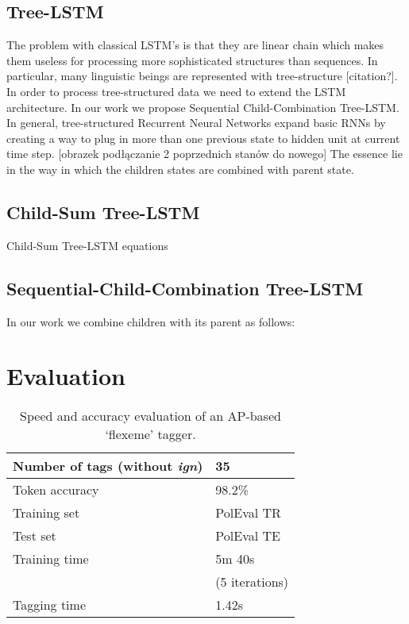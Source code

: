 \documentclass[10pt, a4paper]{article}
\begin{document}
\subsection{Tree-LSTM}
	The problem with classical LSTM's is that they are linear chain which makes them useless for processing more sophisticated structures than sequences. In particular, many linguistic beings are represented with tree-structure [citation?].
	In order to process tree-structured data we need to extend the LSTM architecture. In our work we propose Sequential Child-Combination Tree-LSTM.
	In general, tree-structured Recurrent Neural Networks expand basic RNNs by creating a way to plug in more than one previous state to hidden unit at current time step.
	[obrazek podłączanie 2 poprzednich stanów do nowego]
	The essence lie in the way in which the children states are combined with parent state.

\subsection{Child-Sum Tree-LSTM}
        Child-Sum Tree-LSTM equations
	
\subsection{Sequential-Child-Combination Tree-LSTM}
	In our work we combine children with its parent as follows:
	
\section{Evaluation} 

\begin{table}[h]
 \begin{center}
\begin{tabular}{|l|l|}

      \hline
      Number of tags (without \textit{ign}) & 35\\
      \hline
      Token accuracy & 98.2\%\\
      \hline
      Training set & PolEval TR\\
      \hline
      Test set & PolEval TE\\
           \hline
      Training time & 5m 40s \\
      &(5 iterations)\\
      \hline
      Tagging time & 1.42s\\
 
      \hline
\end{tabular}
\caption{Speed and accuracy evaluation of an AP-based `flexeme' tagger.}
\label{tab:main_tags}
 \end{center}
\end{table}
\end{document}
